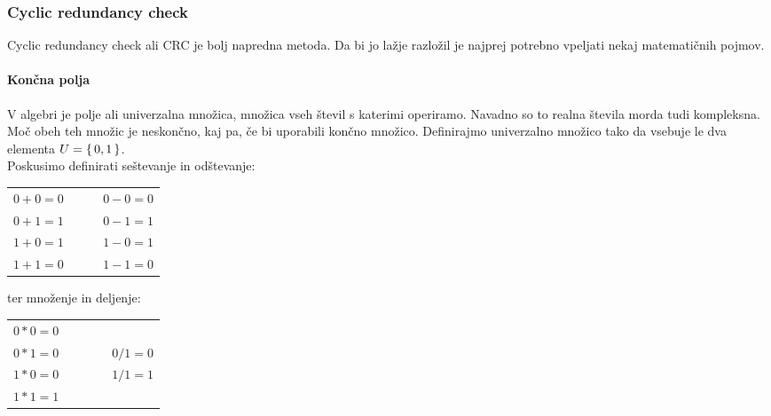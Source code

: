 \documentclass[12pt]{article}
\begin{document}
        \subsubsection{Cyclic redundancy check}
            Cyclic redundancy check ali CRC je bolj napredna metoda. Da bi jo 
            lažje razložil je najprej potrebno vpeljati nekaj matematičnih 
            pojmov.
            \paragraph{Končna polja}
                V algebri je polje ali univerzalna množica, množica vseh števil
                s katerimi operiramo. Navadno so to realna števila morda tudi
                kompleksna. Moč obeh teh množic je neskončno, kaj pa, če bi
                uporabili končno množico. Definirajmo univerzalno množico tako 
                da vsebuje le dva elementa $U = \set{0, 1}$.\\
                Poskusimo definirati seštevanje in odštevanje:\\
                \begin{table}[h!]
                    \centering
                    \begin{tabular}{l p{0.2\linewidth}}
                        $0 + 0 = 0$  & $0 - 0 = 0$ \\
                        $0 + 1 = 1$  & $0 - 1 = 1$ \\
                        $1 + 0 = 1$  & $1 - 0 = 1$ \\
                        $1 + 1 = 0$  & $1 - 1 = 0$ \\
                    \end{tabular}
                \end{table}

                ter množenje in deljenje:\\
                \begin{table}[h!]
                    \centering
                    \begin{tabular}{l p{0.2\linewidth}}
                        $0 * 0 = 0$  &  \\
                        $0 * 1 = 0$  & $0 / 1 = 0$\\
                        $1 * 0 = 0$  & $1 / 1 = 1$\\
                        $1 * 1 = 1$  &  \\
                    \end{tabular}
                \end{table}
\end{document}
